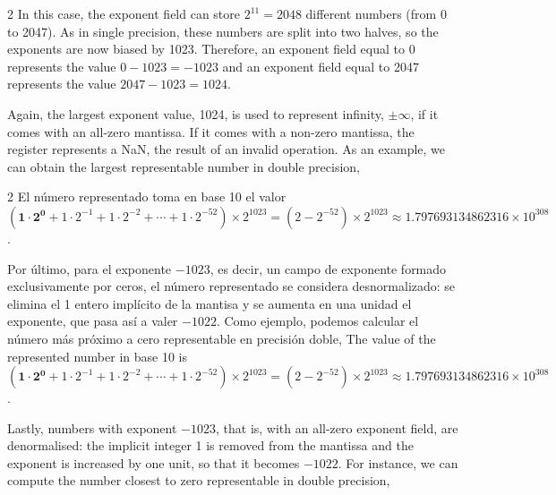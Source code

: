 \begin{paracol}{2}
In this case, the exponent field can store $2^{11}=2048$ different numbers (from 0 to 2047). As in single precision, these numbers are split into two halves, so the exponents are now biased by 1023. Therefore, an exponent field equal to 0 represents the value $0-1023=-1023$ and an exponent field equal to 2047 represents the value $2047-1023=1024$.

Again, the largest exponent value, 1024, is used to represent infinity, $\pm\infty$, if it comes with an all-zero mantissa. If it comes with a non-zero mantissa, the register represents a NaN, the result of an invalid operation.  As an example, we can obtain the largest representable number in double precision,
\end{paracol}
\begin{center}
\end{center}
\begin{paracol}{2}
El número representado toma en base 10 el valor $(\mathbf{1\cdot2^0}+1\cdot2^{-1}+1\cdot2^{-2}+\cdots+1\cdot2^{-52})\times2^{1023}=(2-2^{-52})\times2^{1023}\approx 1.797693134862316\times10^{308}$.

Por último, para el exponente $-1023$, es decir, un campo de exponente formado exclusivamente por ceros, el número representado se considera desnormalizado: se elimina el 1 entero implícito de la mantisa y se aumenta en una unidad el exponente, que pasa así a valer $-1022$.  Como ejemplo, podemos calcular el número más próximo a cero representable en precisión doble,
\switchcolumn
The value of the represented number in base 10 is $(\mathbf{1\cdot2^0}+1\cdot2^{-1}+1\cdot2^{-2}+\cdots+1\cdot2^{-52})\times2^{1023}=(2-2^{-52})\times2^{1023}\approx 1.797693134862316\times10^{308}$.

Lastly, numbers with exponent $-1023$, that is, with an all-zero exponent field, are denormalised: the implicit integer 1 is removed from the mantissa and the exponent is increased by one unit, so that it becomes $-1022$.  For instance, we can compute the number closest to zero representable in double precision,
\end{paracol}
